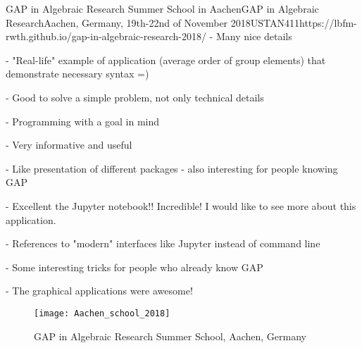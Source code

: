 \begin{event}{GAP in Algebraic Research Summer School in Aachen}{GAP in Algebraic Research}{Aachen, Germany, 19th-22nd of November 2018}{USTAN}{41}{1}{https://lbfm-rwth.github.io/gap-in-algebraic-research-2018/}
- Many nice details

- "Real-life" example of application (average order of group elements) that demonstrate necessary syntax =)

- Good to solve a simple problem, not only technical details

- Programming with a goal in mind

- Very informative and useful

- Like presentation of different packages - also interesting for people knowing GAP

- Excellent the Jupyter notebook!! Incredible! I would like to see more about this application.

- References to "modern" interfaces like Jupyter instead of command line

- Some interesting tricks for people who already know GAP

- The graphical applications were awesome!

\begin{figure}[ht]
  \texttt{[image: Aachen\_school\_2018]}
  \caption*{GAP in Algebraic Research Summer School, Aachen, Germany}
\end{figure}

\end{event}
